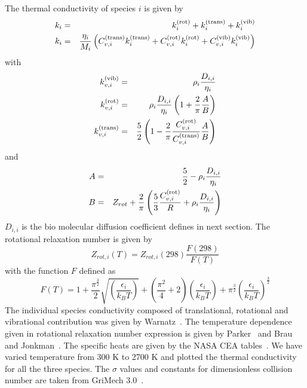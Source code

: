 The thermal conductivity of species $i$ is given by
\begin{eqnarray*}
k_i &=& k_i^{(\textnormal{rot})} + k_i^{(\textnormal{trans})} + k_i^{(\textnormal{vib})} \\
k_i &=& \frac{\eta_i}{M_i} \left(
                        C_{v,i}^{(\textnormal{trans})} k_i^{(\textnormal{trans})} + C_{v,i}^{(\textnormal{rot})} k_i^{(\textnormal{rot})}+ C_{v,i}^{(\textnormal{vib})}  k_i^{(\textnormal{vib})}
                                          \right)
\end{eqnarray*}
with
\begin{eqnarray*}
k_{v,i}^{(\textnormal{vib})}   & =& \rho_i \frac{D_{i,i}}{\eta_i} \\
k_{v,i}^{(\textnormal{rot})}   & =& \rho_i \frac{D_{i,i}}{\eta_i}\left(1 + \frac{2}{\pi}\frac{A}{B}\right) \\
k_{v,i}^{(\textnormal{trans})}   & =&  \frac{5}{2} \left(1 - \frac{2}{\pi}\frac{C_{v,i}^{(\textnormal{rot})}}{C_{v,i}^{(\textnormal{trans})}}\frac{A}{B}\right)
\end{eqnarray*}
%
and
%
\begin{eqnarray*}
  A & = & \frac{5}{2} -  \rho_i \frac{D_{i,i}}{\eta_i}  \\
  B & = & Z_{rot} + \frac{2}{\pi} \left(\frac{5}{3}\frac{C_{v,i}^{(\textnormal{rot})}}{R} + \rho_i \frac{D_{i,i}}{\eta_i}\right)
\end{eqnarray*}
%
$D_{i,i}$ is the bio molecular diffusion coefficient defines in next section. The rotational relaxation number is given by
\begin{equation}
Z_{rot,i}(T) = Z_{rot,i}(298)\frac{F(298)}{F(T)}
\label{thermal_cond:Zrot}
\end{equation}
 with the function $F$ defined as
\begin{equation}
F(T) = 1 + \frac{\pi^{\frac{3}{2}}}{2}\sqrt{\left(\frac{\epsilon_i}{k_B T}\right)}
         + \left(\frac{\pi^2}{4} + 2\right)\left(\frac{\epsilon_i}{k_B T}\right)
         + \pi^{\frac{3}{2}}\left(\frac{\epsilon_i}{k_B T}\right)^{\frac{3}{2}}
\end{equation}
%
The individual species conductivity composed of translational,
rotational and vibrational contribution was given by
Warnatz~\cite{Warnatz}. The temperature dependence given in rotational
relaxation number expression is given by Parker~\cite{Parker} and Brau
and Jonkman~\cite{Jonkman}. The specific heats are given by the NASA CEA
 tables~\cite{CEATables}.  We have varied temperature from 300 K to 2700 K
and plotted the thermal conductivity for all the three
species. The $\sigma$ values and constants for dimensionless collision
number are taken from GriMech 3.0~\cite{gri}.

